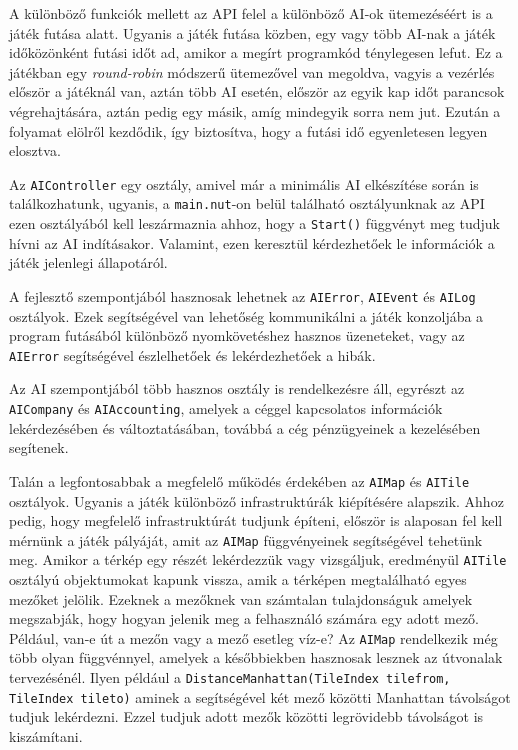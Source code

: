 A különböző funkciók mellett az API felel a különböző AI-ok ütemezéséért is a játék futása alatt. Ugyanis a játék futása közben, egy vagy több AI-nak a játék időközönként futási időt ad, amikor a megírt programkód ténylegesen lefut. Ez a játékban egy \textit{round-robin} módszerű ütemezővel van megoldva, vagyis a vezérlés először a játéknál van, aztán több AI esetén, először az egyik kap időt parancsok végrehajtására, aztán pedig egy másik, amíg mindegyik sorra nem jut. Ezután a folyamat elölről kezdődik, így biztosítva, hogy a futási idő egyenletesen legyen elosztva.

Az \texttt{AIController} egy osztály, amivel már a minimális AI elkészítése során is találkozhatunk, ugyanis, a \texttt{main.nut}-on belül található osztályunknak az API ezen osztályából kell leszármaznia ahhoz, hogy a \texttt{Start()} függvényt meg tudjuk hívni az AI indításakor. Valamint, ezen keresztül kérdezhetőek le információk a játék jelenlegi állapotáról.

A fejlesztő szempontjából hasznosak lehetnek az \texttt{AIError}, \texttt{AIEvent} és \texttt{AILog} osztályok. Ezek segítségével van lehetőség kommunikálni a játék konzoljába a program futásából különböző nyomkövetéshez hasznos üzeneteket, vagy az \texttt{AIError} segítségével észlelhetőek és lekérdezhetőek a hibák.

Az AI szempontjából több hasznos osztály is rendelkezésre áll, egyrészt az \\ \texttt{AICompany} és \texttt{AIAccounting}, amelyek a céggel kapcsolatos információk lekérdezésében és változtatásában, továbbá a cég pénzügyeinek a kezelésében segítenek.

Talán a legfontosabbak a megfelelő működés érdekében az \texttt{AIMap} és \texttt{AITile} osztályok. Ugyanis a játék különböző infrastruktúrák kiépítésére alapszik. Ahhoz pedig, hogy megfelelő infrastruktúrát tudjunk építeni, először is alaposan fel kell mérnünk a játék pályáját, amit az \texttt{AIMap} függvényeinek segítségével tehetünk meg. Amikor a térkép egy részét lekérdezzük vagy vizsgáljuk, eredményül \texttt{AITile} osztályú objektumokat kapunk vissza, amik a térképen megtalálható egyes mezőket jelölik. Ezeknek a mezőknek van számtalan tulajdonságuk amelyek megszabják, hogy hogyan jelenik meg a felhasználó számára egy adott mező. Például, van-e út a mezőn vagy a mező esetleg víz-e? Az \texttt{AIMap} rendelkezik még több olyan függvénnyel, amelyek a későbbiekben hasznosak lesznek az útvonalak tervezésénél. Ilyen például a \texttt{DistanceManhattan(TileIndex tilefrom, TileIndex tileto)} aminek a segítségével két mező közötti Manhattan távolságot tudjuk lekérdezni. Ezzel tudjuk adott mezők közötti legrövidebb távolságot is kiszámítani.

